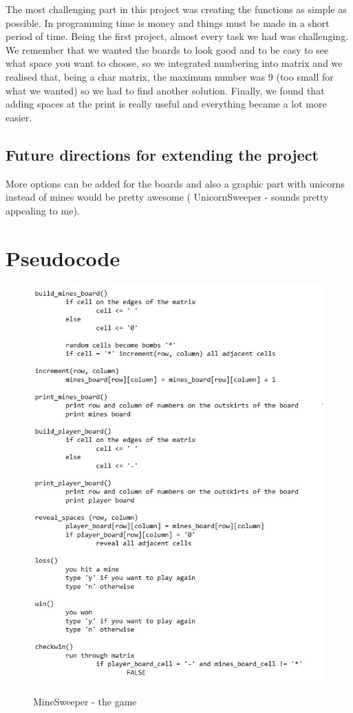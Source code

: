 \documentclass{article}
\begin{document}
The most challenging part in this project was creating the functions as simple as possible. In programming time is money and things must be made in a short period of time. Being the first project, almost every task we had was challenging. We remember that we wanted the boards to look good and to be easy to see what space you want to choose, so we integrated numbering into matrix and we realised that, being a char matrix, the maximum number was 9 (too small for what we wanted) so we had to find another solution. Finally, we found that adding spaces at the print is really useful and everything became a lot more easier.
\newline

\subsection{Future directions for extending the project}
More options can be added for the boards and also a graphic part with unicorns instead of mines would be pretty awesome ( UnicornSweeper - sounds pretty appealing to me).



\pagebreak
\section{Pseudocode}

\begin{figure}[h!]
\caption{MineSweeper - the game}
\includegraphics[scale=0.76]{1}
\label{fig:universe}
\end{figure}
\end{document}
